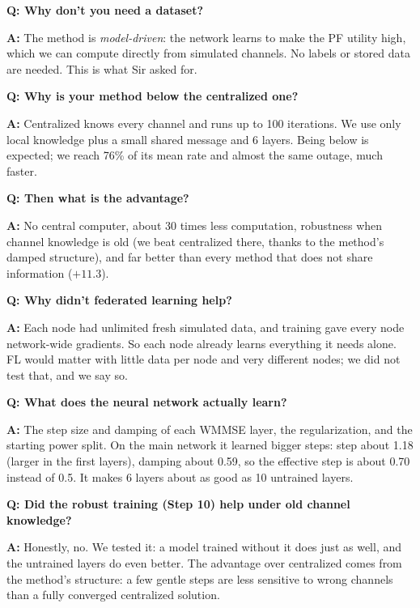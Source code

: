 \documentclass[11pt,a4paper]{article}
\newenvironment{qa}[1]{\par\medskip\textbf{Q: #1}\par\noindent\textbf{A:} }{\par}
\begin{document}
\begin{qa}{Why don't you need a dataset?}
The method is \emph{model-driven}: the network learns to make the PF utility high, which we can compute directly
from simulated channels. No labels or stored data are needed. This is what Sir asked for.
\end{qa}

\begin{qa}{Why is your method below the centralized one?}
Centralized knows every channel and runs up to 100 iterations. We use only local knowledge plus a small shared
message and 6 layers. Being below is expected; we reach 76\% of its mean rate and almost the same outage, much faster.
\end{qa}

\begin{qa}{Then what is the advantage?}
No central computer, about 30 times less computation, robustness when channel knowledge is old (we beat
centralized there, thanks to the method's damped structure), and far better than every method that does not
share information ($+11.3$).
\end{qa}

\begin{qa}{Why didn't federated learning help?}
Each node had unlimited fresh simulated data, and training gave every node network-wide gradients. So each node
already learns everything it needs alone. FL would matter with little data per node and very different nodes;
we did not test that, and we say so.
\end{qa}

\begin{qa}{What does the neural network actually learn?}
The step size and damping of each WMMSE layer, the regularization, and the starting power split. On the main
network it learned bigger steps: step about 1.18 (larger in the first layers), damping about 0.59, so the effective
step is about 0.70 instead of 0.5. It makes 6 layers about as good as 10 untrained layers.
\end{qa}

\begin{qa}{Did the robust training (Step 10) help under old channel knowledge?}
Honestly, no. We tested it: a model trained without it does just as well, and the untrained layers do even
better. The advantage over centralized comes from the method's structure: a few gentle steps are less sensitive
to wrong channels than a fully converged centralized solution.
\end{qa}
\end{document}
